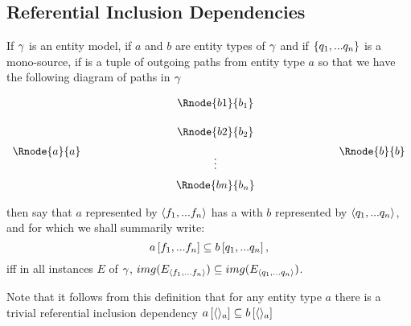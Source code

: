 \subsection{Referential Inclusion Dependencies}
\label{referentialinclusiondependency}

\begin{definition}
If $\gamma$ is an entity model, 
if $a$ and $b$ are entity types of  $\gamma$ and  if $\left\{q_1,...q_n\right\}$
is a mono-source,
if \fntuple is a tuple of outgoing paths from entity type $a$  
so that we have the following diagram of paths in $\gamma$
\setlength{\arraycolsep}{.2cm}
\begin{center}
$
\begin{array}{cp{2cm}ccp{2cm}c}
             & &         & \Rnode{b1}{b_1} &&               \\ [0.5cm]
						 & &         & \Rnode{b2}{b_2} &&               \\ [0.2cm]
\Rnode{a}{a} & &         &                 &&  \Rnode{b}{b} \\ [-0.2cm]						
             & &         &    \vdots       &&               \\ [0.2cm]
             & &         & \Rnode{bn}{b_n} &&               \\ 
\end{array}
$
\end{center}
then say that $a$ represented by $\langle f_1,...f_n\rangle$ 
has a  with $b$ represented by $\langle q_1,...q_n\rangle$, and for which we shall summarily write:
$$
a\left[f_1,...f_n\right]\subseteq b\left[q_1,...q_n\right],
$$
iff in all instances $E$ of $\gamma$,
$img(E_{\langle f_1,...f_n\rangle}) \subseteq img(E_{\langle q_1,...q_n\rangle})$. 
\end{definition}

Note that it follows from this definition that for any entity type $a$ there is a trivial
referential inclusion dependency $
a\left[\langle\rangle_a\right]\subseteq b\left[\langle\rangle_a\right]$

